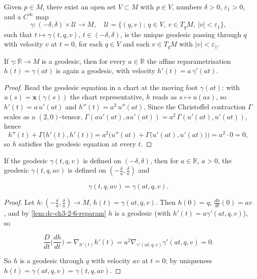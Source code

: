 \begin{proposition}
  \label{prop:dc-ch3-2-5}

  Given $p\in M$, there exist an open set $V\subset M$ with $p\in V$, numbers
  $\delta>0$, $\varepsilon_1>0$, and a $C^\infty$ map
  $$
  \gamma:(-\delta,\delta)\times\mathcal{U}\to M,\quad\mathcal{U}=\{(q,v);\ q\in V,\ v\in T_qM,\ |v|<\varepsilon_1\},
  $$
  such that $t\mapsto\gamma(t,q,v)$, $t\in(-\delta,\delta)$, is the unique geodesic
  passing through $q$ with velocity $v$ at $t=0$, for each $q\in V$ and each
  $v\in T_qM$ with $|v|<\varepsilon_1$.
\end{proposition}

\begin{lemma}
  \label{lem:dc-ch3-2-6-reparam}


  If $\gamma:\mathbb{R}\to M$ is a geodesic, then for every $a\in\mathbb{R}$ the
  affine reparametrisation $h(t)=\gamma(at)$ is again a geodesic, with velocity
  $h'(t)=a\,\gamma'(at)$.
\end{lemma}
\begin{proof}
  \sketch

  Read the geodesic equation in a chart at the moving foot $\gamma(at)$: with
  $u(s)=\mathbf{x}(\gamma(s))$ the chart representative, $h$ reads as $s\mapsto
  u(as)$, so $h'(t)=a\,u'(at)$ and $h''(t)=a^2\,u''(at)$. Since the Christoffel
  contraction $\Gamma$ scales as a $(2,0)$-tensor,
  $\Gamma(au'(at),au'(at))=a^2\,\Gamma(u'(at),u'(at))$, hence
  $$
  h''(t)+\Gamma\big(h'(t),h'(t)\big)
    =a^2\Big(u''(at)+\Gamma\big(u'(at),u'(at)\big)\Big)=a^2\cdot 0=0,
  $$
  so $h$ satisfies the geodesic equation at every $t$.
\end{proof}

\begin{lemma}
  \label{lem:dc-ch3-2-6}


  If the geodesic $\gamma(t,q,v)$ is defined on $(-\delta,\delta)$, then for
  $a\in\mathbb{R}$, $a>0$, the geodesic $\gamma(t,q,av)$ is defined on
  $(-\frac{\delta}{a},\frac{\delta}{a})$ and

  $$
  \gamma(t,q,av)=\gamma(at,q,v).
  $$
\end{lemma}
\begin{proof}
  \sketch

  Let $h:(-\frac{\delta}{a},\frac{\delta}{a})\to M$, $h(t)=\gamma(at,q,v)$.
  Then $h(0)=q$, $\frac{dh}{dt}(0)=av$, and by \cref{lem:dc-ch3-2-6-reparam}
  $h$ is a geodesic (with $h'(t)=a\gamma'(at,q,v)$), so

  $$
  \frac{D}{dt}\Big(\frac{dh}{dt}\Big)=\nabla_{h'(t)}h'(t)=a^2\nabla_{\gamma'(at,q,v)}\gamma'(at,q,v)=0.
  $$

  So $h$ is a geodesic through $q$ with velocity $av$ at $t=0$; by uniqueness
  $h(t)=\gamma(at,q,v)=\gamma(t,q,av)$.
\end{proof}


